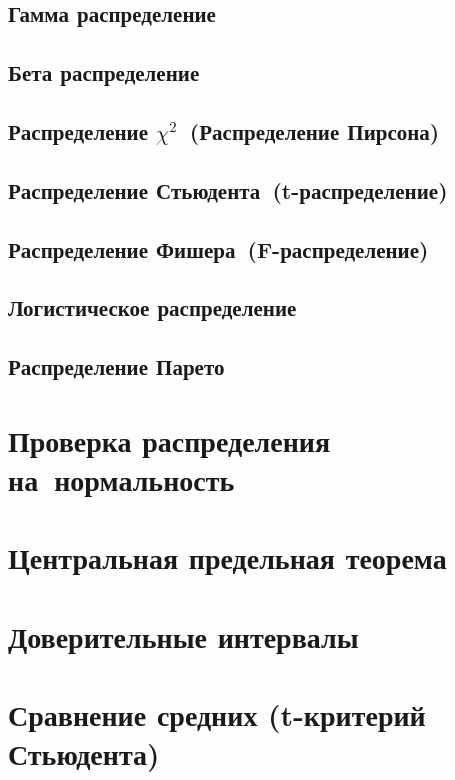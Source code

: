 \documentclass[]{scrartcl}
\begin{document}
\subsection{Гамма распределение}

\subsection{Бета распределение}

\subsection{Распределение $\chi^{2}$~(Распределение Пирсона)}

\subsection{Распределение Стьюдента~(t-распределение)}

\subsection{Распределение Фишера~(F-распределение)}
 
\subsection{Логистическое распределение}

\subsection{Распределение Парето}

\section{Проверка распределения на~нормальность}

\section{Центральная предельная теорема}

\section{Доверительные интервалы}

\section{Сравнение средних (t-критерий Стьюдента)}
\end{document}
